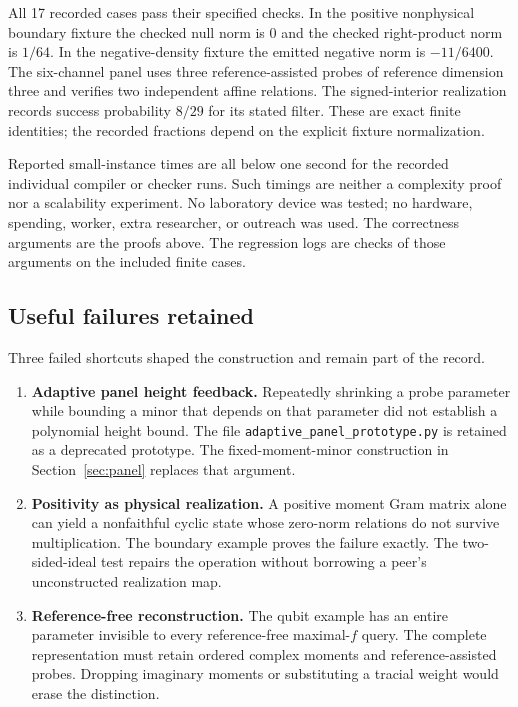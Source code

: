 \documentclass[11pt,a4paper]{article}
\theoremstyle{definition}\newtheorem{definition}[theorem]{Definition}
\begin{document}
All 17 recorded cases pass their specified checks. In the positive nonphysical boundary fixture the checked null norm is $0$ and the checked right-product norm is $1/64$. In the negative-density fixture the emitted negative norm is $-11/6400$. The six-channel panel uses three reference-assisted probes of reference dimension three and verifies two independent affine relations. The signed-interior realization records success probability $8/29$ for its stated filter. These are exact finite identities; the recorded fractions depend on the explicit fixture normalization.

Reported small-instance times are all below one second for the recorded individual compiler or checker runs. Such timings are neither a complexity proof nor a scalability experiment. No laboratory device was tested; no hardware, spending, worker, extra researcher, or outreach was used. The correctness arguments are the proofs above. The regression logs are checks of those arguments on the included finite cases.

\subsection{Useful failures retained}

Three failed shortcuts shaped the construction and remain part of the record.
\begin{enumerate}
\item \textbf{Adaptive panel height feedback.} Repeatedly shrinking a probe parameter while bounding a minor that depends on that parameter did not establish a polynomial height bound. The file \texttt{adaptive\_panel\_prototype.py} is retained as a deprecated prototype. The fixed-moment-minor construction in Section~\ref{sec:panel} replaces that argument.
\item \textbf{Positivity as physical realization.} A positive moment Gram matrix alone can yield a nonfaithful cyclic state whose zero-norm relations do not survive multiplication. The boundary example proves the failure exactly. The two-sided-ideal test repairs the operation without borrowing a peer's unconstructed realization map.
\item \textbf{Reference-free reconstruction.} The qubit example has an entire parameter invisible to every reference-free maximal-$f$ query. The complete representation must retain ordered complex moments and reference-assisted probes. Dropping imaginary moments or substituting a tracial weight would erase the distinction.
\end{enumerate}
\end{document}
